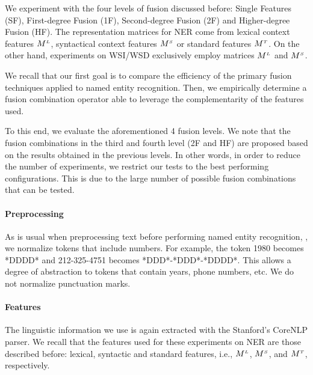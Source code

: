 We experiment with the four levels of fusion discussed before: Single Features (SF), First-degree Fusion (1F), Second-degree Fusion (2F) and Higher-degree Fusion (HF). The representation matrices for NER come from lexical context features $M^{\scriptscriptstyle L}$, syntactical context features $M^{\scriptscriptstyle S}$ or standard features $M^{\scriptscriptstyle T}$.  On the other hand, experiments on WSI/WSD exclusively employ matrices $M^{\scriptscriptstyle L}$ and $M^{\scriptscriptstyle S}$.

We recall that our first goal is to compare the efficiency of the primary  fusion techniques applied to   named entity recognition. Then, we empirically determine a fusion combination operator able to leverage the complementarity of the features used.

To this end, we evaluate the aforementioned 4 fusion levels. We note that the fusion combinations in the third and fourth level (2F and HF) are proposed based on the results obtained in the previous levels. In other words, in order to reduce the number of experiments, we restrict our tests to the best performing configurations. This is due to the large number of possible fusion combinations that can be tested.



\paragraph{Preprocessing}

As is usual when preprocessing text before performing named entity recognition, \cite{RatinovR09}, we normalize tokens that include numbers. For example, the token 1980 becomes *DDDD* and 212-325-4751 becomes *DDD*-*DDD*-*DDDD*. This allows a degree of abstraction to tokens that contain years, phone numbers, etc. We do not normalize punctuation marks.

\paragraph{Features}
The linguistic information we use is again extracted with the Stanford's CoreNLP parser. We recall that the features used for these experiments on NER are those described before: lexical, syntactic and standard features, i.e., $M^{\scriptscriptstyle L}$, $M^{\scriptscriptstyle S}$, and $M^{\scriptscriptstyle T}$, respectively. 

